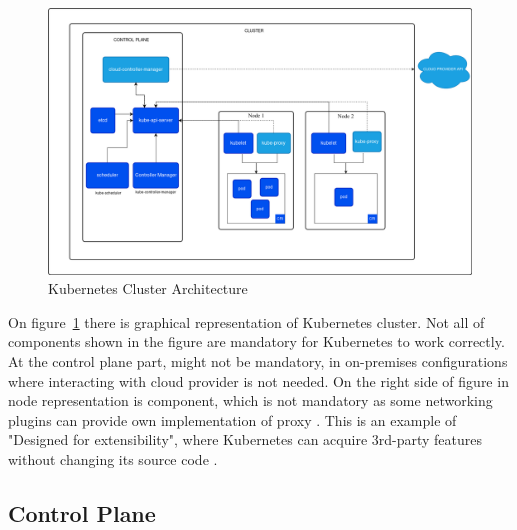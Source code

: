 \begin{figure}[tbh]
    \centering
    \includegraphics[width=1\columnwidth]{images/kubernetes-cluster-architecture.png}
    \caption{Kubernetes Cluster Architecture \cite{KubernetesArch}}
    \label{fig:k8s_arch}
\end{figure}

On figure~\ref{fig:k8s_arch} there is graphical representation of Kubernetes cluster. Not all of components shown in the figure are mandatory for Kubernetes to work correctly. At the control plane part, \textit{} might not be mandatory, in on-premises configurations where interacting with cloud provider is not needed. On the right side of figure in node representation is \textit{} component, which is not mandatory as some networking plugins can provide own implementation of proxy \cite{KubernetesArch}. This is an example of "Designed for extensibility", where Kubernetes can acquire 3rd-party features without changing its source code \cite{KubernetesDocs}.

%     






\subsection{Control Plane}
\label{sec:k8s_cplane}

